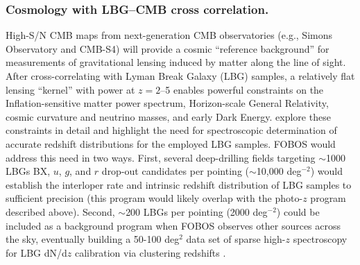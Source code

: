 \subsubsection{Cosmology with LBG--CMB cross correlation.}
\label{sec:LBG}

High-S/N CMB maps from next-generation CMB observatories (e.g., Simons Observatory and CMB-S4) will provide a cosmic
``reference background'' for measurements of gravitational lensing induced by matter along the line of sight.  After
cross-correlating with Lyman Break Galaxy (LBG) samples, a relatively flat lensing ``kernel'' with power at $z = 2$--5
enables powerful constraints on the Inflation-sensitive matter power spectrum, Horizon-scale General Relativity, cosmic
curvature and neutrino masses, and early Dark Energy.  \citet{wilson19} explore these constraints in detail and
highlight the need for spectroscopic determination of accurate redshift distributions for the employed LBG samples.
FOBOS would address this need in two ways.  First, several deep-drilling fields targeting $\sim$1000 LBGs BX, $u$, $g$,
and $r$ drop-out candidates per pointing ($\sim$10,000 deg$^{-2}$) would establish the interloper rate and intrinsic
redshift distribution of LBG samples to sufficient precision (this program would likely overlap with the photo-$z$
program described above).  Second, $\sim$200 LBGs per pointing (2000 deg$^{-2}$) could be included as a background
program when FOBOS observes other sources across the sky, eventually building a 50-100 deg$^2$ data set of sparse
high-$z$ spectroscopy for LBG dN/d$z$ calibration via clustering redshifts \citep[see][]{wilson19}.






